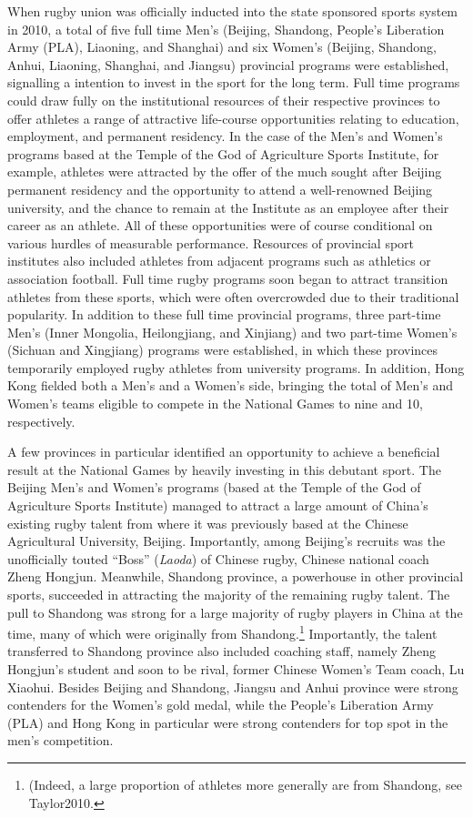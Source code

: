 \begin{CJK}{UTF8}{gbsn}
When rugby union was officially inducted into the state sponsored sports system in 2010, a total of five full time Men's (Beijing, Shandong, People's Liberation Army (PLA), Liaoning, and Shanghai) and six Women's (Beijing, Shandong, Anhui, Liaoning, Shanghai, and Jiangsu) provincial programs were established, signalling a intention to invest in the sport for the long term.  Full time programs could draw fully on the institutional resources of their respective provinces to offer athletes a range of attractive life-course opportunities relating to education, employment, and permanent residency.  In the case of the Men's and Women's programs based at the Temple of the God of Agriculture Sports Institute, for example, athletes were attracted by the offer of the much sought after Beijing permanent residency and the opportunity to attend a well-renowned Beijing university, and the chance to remain at the Institute as an employee after their career as an athlete.  All of these opportunities were of course conditional on various hurdles of measurable performance.  Resources of provincial sport institutes also included athletes from adjacent programs such as athletics or association football.  Full time rugby programs soon began to attract transition athletes from these sports, which were often overcrowded due to their traditional popularity.  In addition to these full time provincial programs, three part-time Men's (Inner Mongolia, Heilongjiang, and Xinjiang) and two part-time Women's (Sichuan and Xingjiang) programs were established, in which these provinces temporarily employed rugby athletes from university programs. In addition, Hong Kong fielded both a Men's and a Women's side, bringing the total of Men's and Women's teams eligible to compete in the National Games to nine and 10, respectively.

A few provinces in particular identified an opportunity to achieve a beneficial result at the National Games by heavily investing in this debutant sport.  The Beijing Men's and Women's programs (based at the Temple of the God of Agriculture Sports Institute) managed to attract a large amount of China's existing rugby talent from where it was previously based at the Chinese Agricultural University, Beijing.  Importantly, among Beijing's recruits was the unofficially touted ``Boss''  (\textit{Laoda}) of Chinese rugby, Chinese national coach Zheng Hongjun.  Meanwhile, Shandong province, a powerhouse in other provincial sports, succeeded in attracting the majority of the remaining rugby talent. The pull to Shandong was strong for a large majority of rugby players in China at the time, many of which were originally from Shandong.\footnote{(Indeed, a large proportion of athletes more generally are from Shandong, see Taylor2010.}  Importantly, the talent transferred to Shandong province also included coaching staff, namely Zheng Hongjun's student and soon to be rival, former Chinese Women's Team coach, Lu Xiaohui.  Besides Beijing and Shandong, Jiangsu and Anhui province were strong contenders for the Women's gold medal, while the People's Liberation Army (PLA) and Hong Kong in particular were strong contenders for top spot in the men's competition.




\end{CJK}
